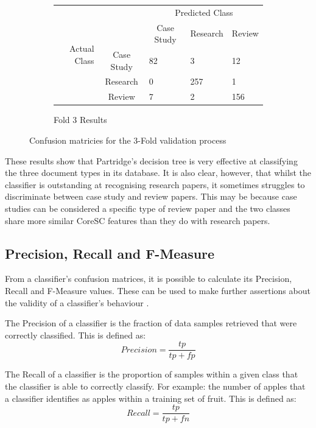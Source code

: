 \begin{figure}[!h]
\begin{subfigure}[b]{\textwidth}
\end{subfigure}

\begin{subfigure}[b]{\textwidth}

\caption{Fold 3 Results}
\centering
\begin{tabular}{ | r l l l l |}
\hline
\multirow{5}{*}{\begin{sideways}{Actual Class}\end{sideways}}
&&\multicolumn{3}{c|}{Predicted Class} \\
&& \multicolumn{1}{c}{Case Study} &	Research&	\multicolumn{1}{c|}{Review}\\
\cline{3-5}
&\multicolumn{1}{c|}{Case Study}&	82&		3	&	12 \\
&\multicolumn{1}{c|}{Research}&	0&		257	&	1\\
&\multicolumn{1}{c|}{Review}&		7&		2	&	156\\
\hline
\end{tabular}

\end{subfigure}

\caption{ Confusion matricies for the 3-Fold validation process}
\label{fig:conf_matrices}

\end{figure}

These results show that Partridge's decision tree is very effective at
classifying the three document types in its database. It is also clear, however,
that whilst the classifier is outstanding at recognising research papers, it
sometimes struggles to discriminate between case study and review papers. This
may be because case studies can be considered a specific type of review paper
and the two classes share more similar CoreSC features than they do with
research papers.  

\subsection{ Precision, Recall and F-Measure }

From a classifier's confusion matrices, it is possible to calculate its
Precision, Recall and F-Measure values. These can be used to make further
assertions about the validity of a classifier's behaviour
\cite{witten2005data}.

The Precision of a classifier is the fraction of data samples retrieved that
were correctly classified. This is defined as:
\[Precision = \frac{tp}{tp+fp} \]

The Recall of a classifier is the proportion of samples within a given class
that the classifier is able to correctly classify. For example: the number of
apples that a classifier identifies as apples within a training set of fruit.
This is defined as:
\[Recall = \frac{tp}{tp+fn} \]

